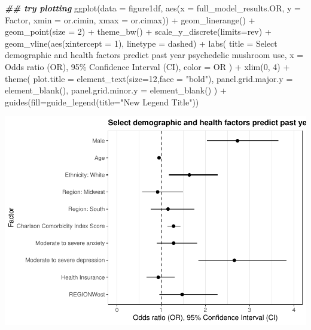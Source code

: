 \documentclass[
]{article}
\newenvironment{Shaded}{\begin{snugshade}}{\end{snugshade}}
\newcommand{\AttributeTok}[1]{\textcolor[rgb]{0.77,0.63,0.00}{#1}}
\newcommand{\DecValTok}[1]{\textcolor[rgb]{0.00,0.00,0.81}{#1}}
\newcommand{\DocumentationTok}[1]{\textcolor[rgb]{0.56,0.35,0.01}{\textbf{\textit{#1}}}}
\newcommand{\FunctionTok}[1]{\textcolor[rgb]{0.00,0.00,0.00}{#1}}
\newcommand{\NormalTok}[1]{#1}
\newcommand{\SpecialCharTok}[1]{\textcolor[rgb]{0.00,0.00,0.00}{#1}}
\newcommand{\StringTok}[1]{\textcolor[rgb]{0.31,0.60,0.02}{#1}}
\begin{document}
\begin{Shaded}
\begin{Highlighting}[]
\DocumentationTok{\#\# try plotting}
\FunctionTok{ggplot}\NormalTok{(}\AttributeTok{data =}\NormalTok{ figure1df, }\FunctionTok{aes}\NormalTok{(}\AttributeTok{x =}\NormalTok{ full\_model\_results.OR, }\AttributeTok{y =}\NormalTok{ Factor, }\AttributeTok{xmin =}\NormalTok{ or.cimin, }\AttributeTok{xmax =}\NormalTok{ or.cimax)) }\SpecialCharTok{+}
  \FunctionTok{geom\_linerange}\NormalTok{() }\SpecialCharTok{+} 
  \FunctionTok{geom\_point}\NormalTok{(}\AttributeTok{size =} \DecValTok{2}\NormalTok{) }\SpecialCharTok{+}
  \FunctionTok{theme\_bw}\NormalTok{() }\SpecialCharTok{+}
  \FunctionTok{scale\_y\_discrete}\NormalTok{(}\AttributeTok{limits=}\NormalTok{rev) }\SpecialCharTok{+} 
  \FunctionTok{geom\_vline}\NormalTok{(}\FunctionTok{aes}\NormalTok{(}\AttributeTok{xintercept =} \DecValTok{1}\NormalTok{), }\AttributeTok{linetype =} \StringTok{\textquotesingle{}dashed\textquotesingle{}}\NormalTok{) }\SpecialCharTok{+} 
  \FunctionTok{labs}\NormalTok{(}
    \AttributeTok{title =} \StringTok{\textquotesingle{}Select demographic and health factors predict past year psychedelic mushroom use\textquotesingle{}}\NormalTok{,}
    \AttributeTok{x =} \StringTok{\textquotesingle{}Odds ratio (OR), 95\% Confidence Interval (CI)\textquotesingle{}}\NormalTok{,}
    \AttributeTok{color =} \StringTok{\textquotesingle{}OR\textquotesingle{}}
\NormalTok{  ) }\SpecialCharTok{+}
  \FunctionTok{xlim}\NormalTok{(}\DecValTok{0}\NormalTok{, }\DecValTok{4}\NormalTok{) }\SpecialCharTok{+} 
  \FunctionTok{theme}\NormalTok{(}
    \AttributeTok{plot.title =} \FunctionTok{element\_text}\NormalTok{(}\AttributeTok{size=}\DecValTok{12}\NormalTok{,}\AttributeTok{face =} \StringTok{"bold"}\NormalTok{),}
    \AttributeTok{panel.grid.major.y =} \FunctionTok{element\_blank}\NormalTok{(),}
    \AttributeTok{panel.grid.minor.y =} \FunctionTok{element\_blank}\NormalTok{()}
\NormalTok{  ) }\SpecialCharTok{+}
  \FunctionTok{guides}\NormalTok{(}\AttributeTok{fill=}\FunctionTok{guide\_legend}\NormalTok{(}\AttributeTok{title=}\StringTok{"New Legend Title"}\NormalTok{))}
\end{Highlighting}
\end{Shaded}

\includegraphics{PM-test_files/figure-latex/plot-1.pdf}
\end{document}
